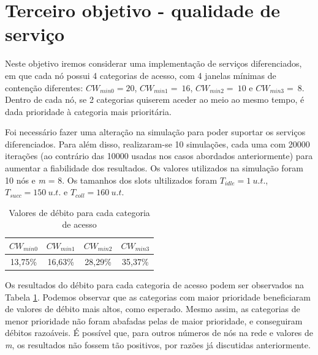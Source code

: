 \section{Terceiro objetivo - qualidade de serviço}

Neste objetivo iremos considerar uma implementação de serviços diferenciados,
em que cada nó possui 4 categorias de acesso, com 4 janelas mínimas de
contenção diferentes: $CW_{min0} = 20$, $CW_{min1} =~16$, $CW_{min2} =~10$ e
$CW_{min3} =~8$. Dentro de cada nó, se 2 categorias
quiserem aceder ao meio ao mesmo tempo, é dada prioridade à categoria mais
prioritária.

\vspace{\baselineskip}

Foi necessário fazer uma alteração na simulação para poder suportar os
serviços diferenciados. Para além disso, realizaram-se 10 simulações,
cada uma com 20000 iterações (ao contrário das 10000 usadas nos casos
abordados anteriormente) para aumentar a fiabilidade dos resultados.
Os valores utilizados na simulação foram 10 nós e \textit{m} = 8.
Os tamanhos dos slots ultilizados foram $T_{idle} = 1~u.t.$,
$T_{succ} = 150~u.t.$ e $T_{coll} = 160~u.t.$

\vspace{\baselineskip}
\begin{table}[h]
    \centering
    \begin{tabular}{c|c|c|c}
        $CW_{min0}$ & $CW_{min1}$ & $CW_{min2}$ & $CW_{min3}$\\
        \midrule
        13,75\% & 16,63\% & 28,29\% & 35,37\%
    \end{tabular}
    \caption{Valores de débito para cada categoria de acesso}
    \label{tab:objetivo3}
\end{table}
\vspace{\baselineskip}

Os resultados do débito para cada categoria de acesso podem ser observados
na Tabela \ref{tab:objetivo3}. Podemos observar que as categorias com maior
prioridade beneficiaram de valores de débito mais altos, como esperado.
Mesmo assim, as categorias de menor prioridade não foram abafadas pelas de
maior prioridade, e conseguiram débitos razoáveis. É possível que, para
outros números de nós na rede e valores de \textit{m}, os resultados não
fossem tão positivos, por razões já discutidas anteriormente.
